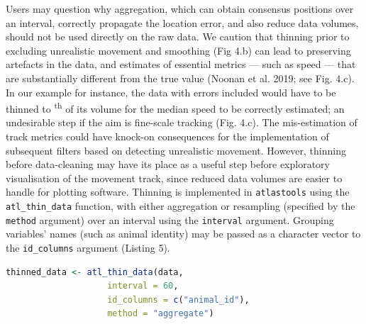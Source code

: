 \documentclass[10pt,paper=a4,headings=standardclasses
]{scrartcl}
\begin{document}
Users may question why aggregation, which can obtain consensus positions over an interval, correctly propagate the location error, and also reduce data volumes, should not be used directly on the raw data.
We caution that thinning prior to excluding unrealistic movement and smoothing (Fig 4.b) can lead to preserving artefacts in the data, and estimates of essential metrics --- such as speed --- that are substantially different from the true value (Noonan et al. 2019; see Fig. 4.c).
In our example for instance, the data with errors included would have to be thinned to \textsuperscript{th} of its volume for the median speed to be correctly estimated; an undesirable step if the aim is fine-scale tracking (Fig. 4.c).
The mis-estimation of track metrics could have knock-on consequences for the implementation of subsequent filters based on detecting unrealistic movement.
However, thinning before data-cleaning may have its place as a useful step before exploratory visualisation of the movement track, since reduced data volumes are easier to handle for plotting software.
%
Thinning is implemented in \texttt{atlastools} using the \texttt{atl\_thin\_data} function, with either aggregation or resampling (specified by the \texttt{method} argument) over an interval using the \texttt{interval} argument.
Grouping variables' names (such as animal identity) may be passed as a character vector to the \texttt{id\_columns} argument (Listing 5).

\begin{lstlisting}[float, language=R, style=customR, caption = {Code to thin data by aggregation in \texttt{atlastools}. The method can be either "aggregate" or "resample". 
The time interval is specified in seconds, while the \texttt{id\_columns} allows a character vector of column names to be passed to the function, with these columns used as identity variables.
Both methods return a dataset with one rows per time-interval.}]
thinned_data <- atl_thin_data(data,
                    interval = 60,
                    id_columns = c("animal_id"),
                    method = "aggregate")
\end{lstlisting}
\end{document}
